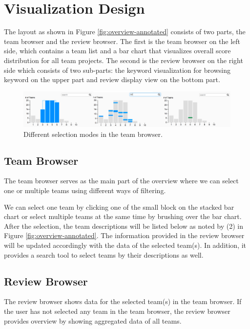 \documentclass{sigchi}
\begin{document}
\section{Visualization Design}

The layout as shown in Figure \ref{fig:overview-annotated} consists of two
parts, the team browser and the review browser.  The first is the team browser
on the left side, which contains a team list and a bar chart that visualizes
overall score distribution for all team projects. The second is the review
browser on the right side which consists of two sub-parts: the keyword
visualization for browsing keyword on the upper part and review display view on
the bottom part.

\begin{figure}[tb]
\centering
\includegraphics[width=2.0\columnwidth]{images/3charts-hor}
\caption{Different selection modes in the team browser.}
\label{fig:keyword-lists}
\end{figure}

\subsection{Team Browser}
The team browser serves as the main part of the overview
where we can select one or multiple teams using different ways of filtering.

We can select one team by clicking one of the small block on the stacked bar
chart or select multiple teams at the same time by brushing over the bar chart.
After the selection, the team descriptions will be listed below as noted by (2)
in Figure \ref{fig:overview-annotated}. The information provided in the review
browser will be updated accordingly with the data of the selected team(s). In
addition, it provides a search tool to select teams by their descriptions as
well.



\subsection{Review Browser}

The review browser shows data for the selected team(s) in the team browser. If
the user has not selected any team in the team browser, the review browser provides overview by showing aggregated data of all teams.
\end{document}
